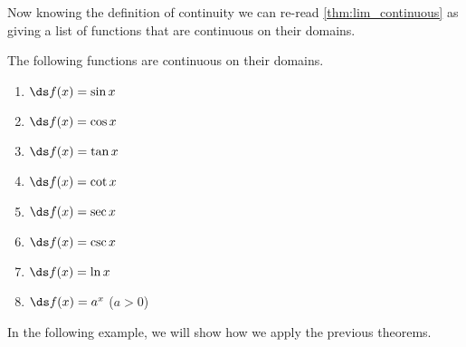 Now knowing the definition of continuity we can re-read \autoref{thm:lim_continuous} as giving a list of functions that are continuous on their domains.

\begin{theorem}\label{thm:continuous_functions}%
The following functions are continuous on their domains.
\begin{multicols}{2}
 \begin{enumerate}
		\item	$\ds f(x) = \sin x$
		\item	$\ds f(x) = \cos x$
		\item	$\ds f(x) = \tan x$
		\item	$\ds f(x) = \cot x$
		\item	$\ds f(x) = \sec x$
		\item	$\ds f(x) = \csc x$
		\item	$\ds f(x) = \ln x$
		\item	$\ds f(x) = a^x$ ($a>0$)
\end{enumerate}
\end{multicols}
\end{theorem}

In the following example, we will show how we apply the previous theorems.

